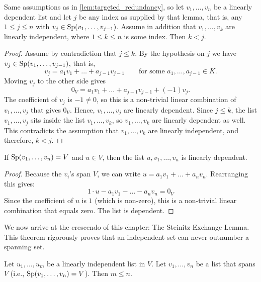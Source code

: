 \begin{lemma}
\label{lem:drop_index_beyond_head}
Same assumptions as in \cref{lem:targeted_redundancy}, so let $v_1, \dots, v_n$ be a linearly dependent list and let $j$ be any index as supplied by that lemma, that is, any $1 \le j \le n$ with $v_j \in \operatorname{Sp}(v_1, \dots, v_{j-1})$. Assume in addition that $v_1, \dots, v_k$ are linearly independent, where $1 \le k \le n$ is some index. Then $k < j$.
\end{lemma}

\begin{proof}
Assume by contradiction that $j \le k$. By the hypothesis on $j$ we have $v_j \in \operatorname{Sp}(v_1, \dots, v_{j-1})$, that is,
\[
v_j = a_1 v_1 + \dots + a_{j-1} v_{j-1} \qquad \text{for some } a_1, \dots, a_{j-1} \in K.
\]
Moving $v_j$ to the other side gives
\[
0_V = a_1 v_1 + \dots + a_{j-1} v_{j-1} + (-1) v_j.
\]
The coefficient of $v_j$ is $-1 \ne 0$, so this is a non-trivial linear combination of $v_1, \dots, v_j$ that gives $0_V$. Hence, $v_1, \dots, v_j$ are linearly dependent. Since $j \le k$, the list $v_1, \dots, v_j$ sits inside the list $v_1, \dots, v_k$, so $v_1, \dots, v_k$ are linearly dependent as well. This contradicts the assumption that $v_1, \dots, v_k$ are linearly independent, and therefore, $k < j$.
\end{proof}

\begin{lemma}
\label{lem:span_overcrowding}
If $\operatorname{Sp}(v_1, \dots, v_n) = V$ and $u \in V$, then the list $u, v_1, \dots, v_n$ is linearly dependent.
\end{lemma}

\begin{proof}
Because the $v_i$'s span $V$, we can write $u = a_1 v_1 + \dots + a_n v_n$. Rearranging this gives:
\[
1 \cdot u - a_1 v_1 - \dots - a_n v_n = 0_V
\]
Since the coefficient of $u$ is $1$ (which is non-zero), this is a non-trivial linear combination that equals zero. The list is dependent.
\end{proof}

We now arrive at the crescendo of this chapter: The Steinitz Exchange Lemma. This theorem rigorously proves that an independent set can never outnumber a spanning set.

\begin{theorem}
\label{thm:steinitz}
Let $u_1, \dots, u_m$ be a linearly independent list in $V$. Let $v_1, \dots, v_n$ be a list that spans $V$ (i.e., $\operatorname{Sp}(v_1, \dots, v_n) = V$). Then $m \le n$.
\end{theorem}

